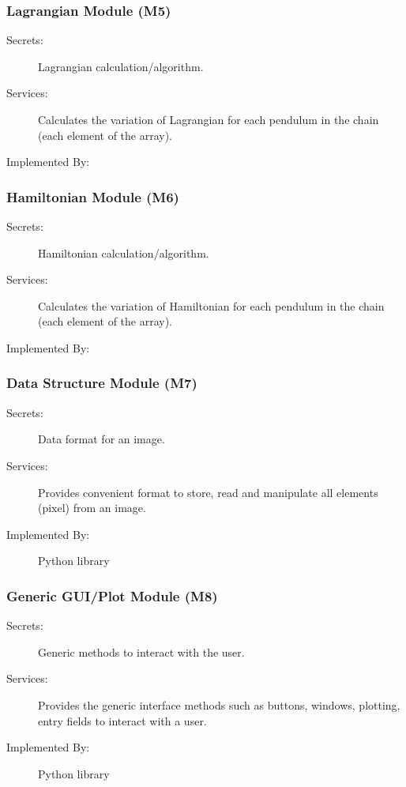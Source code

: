 \documentclass[12pt, titlepage]{article}
\begin{document}
\subsubsection{Lagrangian Module (M5)}
\label{MG_LA}
\begin{description}
\item[Secrets:] Lagrangian calculation/algorithm.
\item[Services:] Calculates the variation of Lagrangian for each pendulum in 
the chain (each element of the array).
\item[Implemented By:] \progname{}
\end{description}

\subsubsection{Hamiltonian Module (M6)}
\label{MG_HA}
\begin{description}
\item[Secrets:] Hamiltonian calculation/algorithm.
\item[Services:] Calculates the variation of Hamiltonian for each pendulum in 
the chain (each element of the array).
\item[Implemented By:] \progname{}
\end{description}

\subsubsection{Data Structure Module (M7)}
\label{MG_DataStruct}
\begin{description}
\item[Secrets:] Data format for an image.
\item[Services:] Provides convenient format to store, read and manipulate all 
elements (pixel) from an image.
\item[Implemented By:] Python library
\end{description}

\subsubsection{Generic GUI/Plot Module (M8)}
\label{MG_GUIGene}
\begin{description}
\item[Secrets:] Generic methods to interact with the user.
\item[Services:] Provides the generic interface methods such as buttons, 
windows, plotting, entry fields to interact with a user.
\item[Implemented By:] Python library
\end{description}
\end{document}
